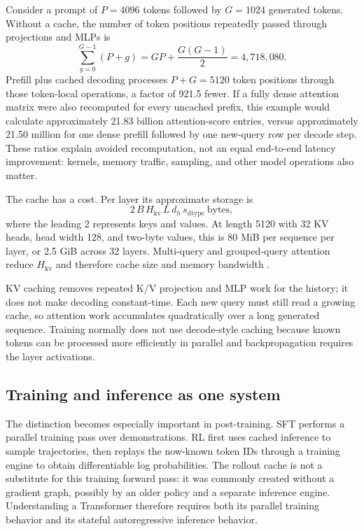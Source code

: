 Consider a prompt of $P=4096$ tokens followed by $G=1024$ generated tokens. Without a
cache, the number of token positions repeatedly passed through projections and MLPs is
\begin{equation}
  \sum_{g=0}^{G-1}(P+g)
  =GP+\frac{G(G-1)}{2}
  =4{,}718{,}080.
\end{equation}
Prefill plus cached decoding processes $P+G=5120$ token positions through those
token-local operations, a factor of 921.5 fewer. If a fully dense attention matrix were
also recomputed for every uncached prefix, this example would calculate approximately
21.83 billion attention-score entries, versus approximately 21.50 million for one dense
prefill followed by one new-query row per decode step. These ratios explain avoided
recomputation, not an equal end-to-end latency improvement: kernels, memory traffic,
sampling, and other model operations also matter.

The cache has a cost. Per layer its approximate storage is
\begin{equation}
  2\,B\,H_{\mathrm{kv}}\,L\,d_h\,s_{\mathrm{dtype}}\ \text{bytes},
\end{equation}
where the leading 2 represents keys and values. At length 5120 with 32 KV heads, head
width 128, and two-byte values, this is 80 MiB per sequence per layer, or 2.5 GiB across
32 layers. Multi-query and grouped-query attention reduce $H_{\mathrm{kv}}$ and therefore
cache size and memory bandwidth \citep{shazeer2019fastdecoding}.

KV caching removes repeated K/V projection and MLP work for the history; it does not make
decoding constant-time. Each new query must still read a growing cache, so attention work
accumulates quadratically over a long generated sequence. Training normally does not use
decode-style caching because known tokens can be processed more efficiently in parallel
and backpropagation requires the layer activations.

\subsection{Training and inference as one system}

The distinction becomes especially important in post-training. SFT performs a parallel
training pass over demonstrations. RL first uses cached inference to sample trajectories,
then replays the now-known token IDs through a training engine to obtain differentiable
log probabilities. The rollout cache is not a substitute for this training forward pass:
it was commonly created without a gradient graph, possibly by an older policy and a
separate inference engine. Understanding a Transformer therefore requires both its
parallel training behavior and its stateful autoregressive inference behavior.
